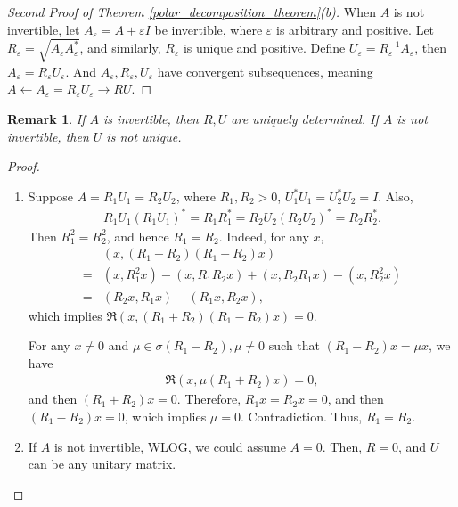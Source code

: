 \documentclass[11pt]{book}
\newtheorem{remark}{Remark}[section]
\theoremstyle{definition}
\numberwithin{equation}{chapter}
\begin{document}
\begin{proof}[Second Proof of Theorem \ref{polar_decomposition_theorem}(b)]
When $A$ is not invertible, let $A_\varepsilon = A + \varepsilon I$ be invertible, where $\varepsilon$ is arbitrary and positive. Let $R_\varepsilon = \sqrt{A_\varepsilon A_\varepsilon^*}$, and similarly, $R_\varepsilon$ is unique and positive. Define $U_\varepsilon = R_\varepsilon^{-1} A_\varepsilon$, then $A_\varepsilon = R_\varepsilon U_\varepsilon$. And $A_\varepsilon, R_\varepsilon, U_\varepsilon$ have convergent subsequences, meaning $A \gets A_\varepsilon = R_\varepsilon U_\varepsilon \to RU$.
\end{proof}

\begin{remark}
If $A$ is invertible, then $R, U$ are uniquely determined. If $A$ is not invertible, then $U$ is not unique.
\end{remark}
\begin{proof}
~\begin{enumerate}[label=(\alph*)]
    \item Suppose $A = R_1U_1 = R_2 U_2$, where $R_1, R_2 > 0$, $U_1^* U_1 = U_2^* U_2 = I$. Also,
    \begin{align*}
        R_1 U_1 \left(R_1 U_1\right)^* = R_1 R_1^* = R_2 U_2 \left(R_2 U_2\right)^* = R_2 R_2^*.
    \end{align*}
    Then $R_1^2 = R_2^2$, and hence $R_1 = R_2$. Indeed, for any $x$, 
    \begin{align*}
        & \left(x, (R_1 + R_2)(R_1 - R_2)x\right) \\
        = & (x, R_1^2x) - (x, R_1 R_2 x) + (x, R_2 R_1 x) - (x, R_2^2x) \\
        = & (R_2 x, R_1 x) - (R_1 x, R_2 x),
    \end{align*}
    which implies $\Re\left(x, (R_1 + R_2)(R_1 - R_2)x\right) = 0$. 
    
    For any $x \neq 0$ and $\mu \in \sigma(R_1 - R_2), \mu \neq 0$ such that $(R_1 - R_2)x = \mu x$, we have
    \begin{align*}
        \Re\left(x, \mu (R_1 + R_2) x\right) = 0,
    \end{align*}
    and then $(R_1 + R_2) x = 0$. Therefore, $R_1 x = R_2 x = 0$, and then $(R_1 - R_2)x = 0$, which implies $\mu = 0$. Contradiction. Thus, $R_1 = R_2$.
    
    \item If $A$ is not invertible, WLOG, we could assume $A = 0$. Then, $R = 0$, and $U$ can be any unitary matrix.
\end{enumerate}
\end{proof}
\end{document}
